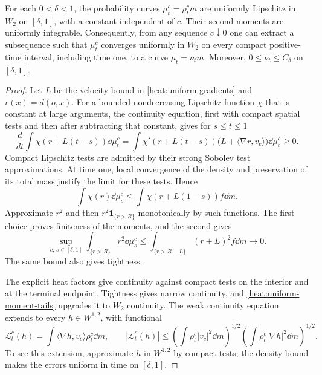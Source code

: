 \begin{lemma}
\label{heat:curve-compactness}
For each \(0<\delta<1\), the probability curves
\(\mu_t^c=\rho_t^c m\) are uniformly Lipschitz in \(W_2\)
on \([\delta,1]\), with a constant independent of \(c\).
Their second moments are uniformly integrable. Consequently,
from any sequence \(c\downarrow0\) one can extract a
subsequence such that \(\mu_t^c\) converges uniformly in
\(W_2\) on every compact positive-time interval, including
time one, to a curve \(\mu_t=\nu_t m\). Moreover,
\(0\le\nu_t\le C_\delta\) on \([\delta,1]\).
\end{lemma}

\begin{proof}
Let \(L\) be the velocity bound in
\eqref{heat:uniform-gradients} and \(r(x)=d(o,x)\).
For a bounded nondecreasing Lipschitz function \(\chi\) that
is constant at large arguments, the continuity equation,
first with compact spatial tests and then after subtracting
that constant, gives for \(s\le t\le1\)
\[
\frac d{dt}\int\chi(r+L(t-s))\dd\mu_t^c
=\int\chi'(r+L(t-s))
\bigl(L+\langle\nabla r,v_c\rangle\bigr)\dd\mu_t^c\ge0.
\]
Compact Lipschitz tests are admitted by their strong Sobolev
test approximations. At time one, local convergence of the
density and preservation of its total mass justify the limit
for these tests. Hence
\begin{equation}
\label{heat:radial-domination}
\int\chi(r)\dd\mu_s^c
\le\int\chi(r+L(1-s))f\dd m.
\end{equation}
Approximate \(r^2\) and then
\(r^2\mathbf1_{\{r>R\}}\) monotonically by such functions.
The first choice proves finiteness of the moments, and the
second gives
\begin{equation}
\label{heat:uniform-moment-tails}
\sup_{c,\,s\in[\delta,1]}
\int_{\{r>R\}}r^2\dd\mu_s^c
\le\int_{\{r>R-L\}}(r+L)^2f\dd m\longrightarrow0.
\end{equation}
The same bound also gives tightness.

The explicit heat factors give continuity against compact
tests on the interior and at the terminal endpoint. Tightness
gives narrow continuity, and
\eqref{heat:uniform-moment-tails} upgrades it to \(W_2\)
continuity. The weak continuity equation extends to every
\(h\in W^{1,2}\), with functional
\[
\mathcal L_t^c(h)=\int\langle\nabla h,v_c\rangle\rho_t^c\dd m,
\qquad
|\mathcal L_t^c(h)|
\le\left(\int\rho_t^c|v_c|^2\dd m\right)^{1/2}
\left(\int\rho_t^c|\nabla h|^2\dd m\right)^{1/2}.
\]
To see this extension, approximate \(h\) in \(W^{1,2}\)
by compact tests; the density bound makes the errors uniform
in time on \([\delta,1]\).


\end{proof}
